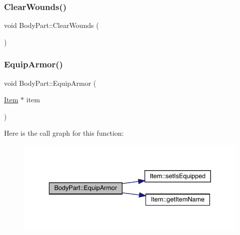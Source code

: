 \mbox{\label{class_body_part_aad10894946e0dc672d9fbaecae496cc9}} 
\subsubsection{\texorpdfstring{Clear\+Wounds()}{ClearWounds()}}
{\footnotesize\ttfamily void Body\+Part\+::\+Clear\+Wounds (\begin{DoxyParamCaption}{ }\end{DoxyParamCaption})}

\mbox{\label{class_body_part_aa12ae5563a19cabd664731bbba3c7ea6}} 
\subsubsection{\texorpdfstring{Equip\+Armor()}{EquipArmor()}\hspace{0.1cm}{\footnotesize\ttfamily [1/2]}}
{\footnotesize\ttfamily void Body\+Part\+::\+Equip\+Armor (\begin{DoxyParamCaption}\item[{\mbox{\hyperlink{class_item}{Item}} $\ast$}]{item }\end{DoxyParamCaption})}

Here is the call graph for this function\+:
\nopagebreak
\begin{figure}[H]
\begin{center}
\leavevmode
\includegraphics[width=336pt]{d2/d6f/class_body_part_aa12ae5563a19cabd664731bbba3c7ea6_cgraph}
\end{center}
\end{figure}
\mbox{\label{class_body_part_a651b65c40c95ecad5a8388736d6cc73a}} 
